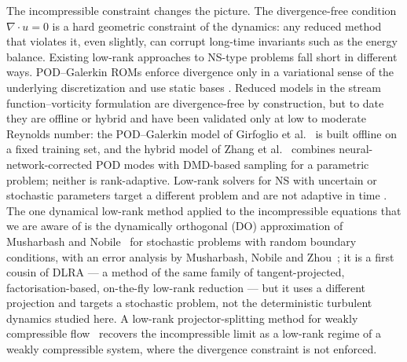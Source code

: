 The incompressible constraint changes the picture. The divergence-free
condition $\nabla \cdot u = 0$ is a hard geometric constraint of the
dynamics: any reduced method that violates it, even slightly, can corrupt
long-time invariants such as the energy balance. Existing low-rank approaches
to NS-type problems fall short in different ways. POD--Galerkin ROMs enforce
divergence only in a variational sense of the underlying discretization and
use static bases \cite{loorenzi2016,hijazi2020,star2021}. Reduced models in
the stream function--vorticity formulation are divergence-free by
construction, but to date they are offline or hybrid and have been validated
only at low to moderate Reynolds number: the POD--Galerkin model of Girfoglio
et al.~\cite{girfoglio2022pod} is built offline on a fixed training set, and
the hybrid model of Zhang et al.~\cite{zhang2024} combines
neural-network-corrected POD modes with DMD-based sampling for a parametric
problem; neither is rank-adaptive. Low-rank solvers for NS with uncertain or
stochastic parameters target a different problem and are not adaptive in time
\cite{lee2017,elman2019low,olshanskii2024}. The one dynamical low-rank method
applied to the incompressible equations that we are aware of is the
dynamically orthogonal (DO) approximation of Musharbash and
Nobile~\cite{musharbash2018} for stochastic problems with random boundary
conditions, with an error analysis by Musharbash, Nobile and
Zhou~\cite{musharbash2015}; it is a first cousin of DLRA --- a method of the
same family of tangent-projected, factorisation-based, on-the-fly low-rank
reduction --- but it uses a different projection and targets a stochastic
problem, not the deterministic turbulent dynamics studied here. A low-rank
projector-splitting method for weakly compressible
flow~\cite{einkemmer2018} recovers the incompressible limit as a low-rank
regime of a weakly compressible system, where the divergence constraint is not
enforced.

